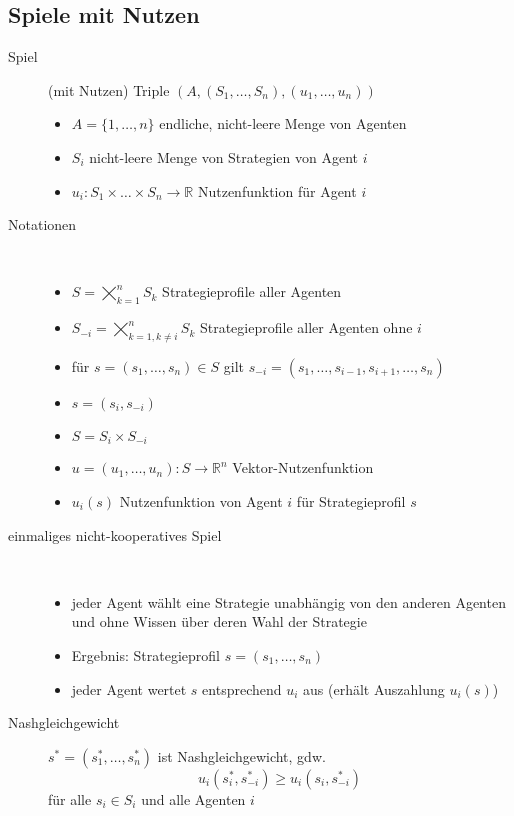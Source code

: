 \subsection{Spiele mit Nutzen}
	\begin{description}
		\item[Spiel] (mit Nutzen) Triple $(A,(S_1,\dots,S_n),(u_1,\dots,u_n))$
			\begin{itemize}
				\item $A=\{1,\dots,n\}$ endliche, nicht-leere Menge von Agenten
				\item $S_i$ nicht-leere Menge von Strategien von Agent $i$
				\item $u_i:S_1\times\dots\times S_n\rightarrow\mathbb{R}$ Nutzenfunktion für Agent $i$
			\end{itemize}
		\item[Notationen]\ \\\vspace*{-\baselineskip}
			\begin{itemize}
				\item $S=\bigtimes\limits_{k=1}^n S_k$ Strategieprofile aller Agenten
				\item $S_{-i}=\bigtimes\limits_{k=1, k\neq i}^n S_k$ Strategieprofile aller Agenten ohne $i$
				\item für $s=(s_1,\dots,s_n)\in S$ gilt $s_{-i}=(s_1,\dots,s_{i-1},s_{i+1},\dots,s_n)$
				\item $s=(s_i,s_{-i})$
				\item $S=S_i\times S_{-i}$
				\item $u=(u_1,\dots,u_n):S\rightarrow \mathbb{R}^n$ Vektor-Nutzenfunktion
				\item $u_i(s)$ Nutzenfunktion von Agent $i$ für Strategieprofil $s$
			\end{itemize}
		\item[einmaliges nicht-kooperatives Spiel] \ \\\vspace*{-\baselineskip}
			\begin{itemize}
				\item jeder Agent wählt eine Strategie unabhängig von den anderen Agenten und ohne Wissen über deren Wahl der Strategie
				\item Ergebnis: Strategieprofil $s=(s_1,\dots,s_n)$
				\item jeder Agent wertet $s$ entsprechend $u_i$ aus (erhält Auszahlung $u_i(s)$)
			\end{itemize}
		\item[Nashgleichgewicht] $s^{*}=(s_1^{*},\dots,s_n^{*})$ ist Nashgleichgewicht, gdw.
			\[u_i(s_i^{*},s_{-i}^{*})\geq u_i(s_i,s_{-i}^{*})\]
			für alle $s_i\in S_i$ und alle Agenten $i$
	\end{description}
